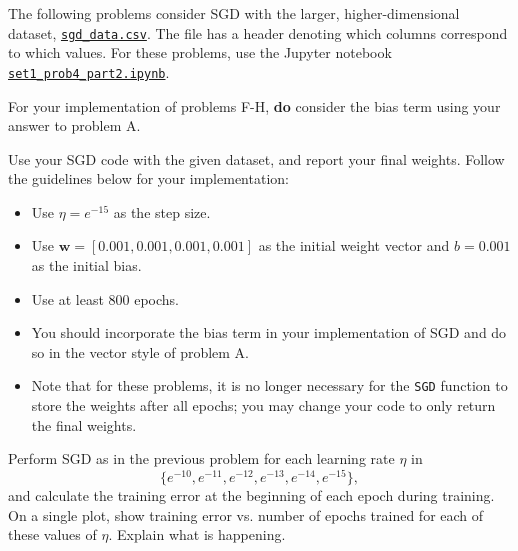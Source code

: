 \begin{solution}

\end{solution}


The following problems consider SGD with the larger, higher-dimensional dataset, \href{https://github.com/lakigigar/Caltech-CS155-2021/blob/main/psets/set1/data/sgd_data.csv}{\texttt{sgd_data.csv}}. The file has a header denoting which columns correspond to which values. For these problems, use the Jupyter notebook \href{https://github.com/lakigigar/Caltech-CS155-2021/blob/main/psets/set1/set1_prob4_part2.ipynb}{\texttt{set1_prob4_part2.ipynb}}.

For your implementation of problems F-H, \textbf{do} consider the bias term using your answer to problem A.

\begin{problem}[6]
  Use your SGD code with the given dataset, and report your final weights. Follow the guidelines below for your implementation:

  \begin{itemize}
    \item Use $\eta = e^{-15}$ as the step size.  
    \item Use $\mathbf{w} = [0.001, 0.001, 0.001, 0.001]$ as the initial weight vector and $b = 0.001$ as the initial bias.
    \item Use at least 800 epochs.
    \item You should incorporate the bias term in your implementation of SGD and do so in the vector style of problem A.
    \item Note that for these problems, it is no longer necessary for the \texttt{SGD} function to store the weights after all epochs; you may change your code to only return the final weights.
  \end{itemize}
  
\end{problem}
\begin{solution}
\end{solution}

\begin{problem}[2]
  Perform SGD as in the previous problem for each learning rate $\eta$ in \[\{e^{-10}, e^{-11}, e^{-12}, e^{-13}, e^{-14}, e^{-15}\},\] and calculate the training error at the beginning of each epoch during training.  On a single plot, show training error vs. number of epochs trained for each of these values of $\eta$. Explain what is happening.
\end{problem}
\begin{solution}
  
\end{solution}


